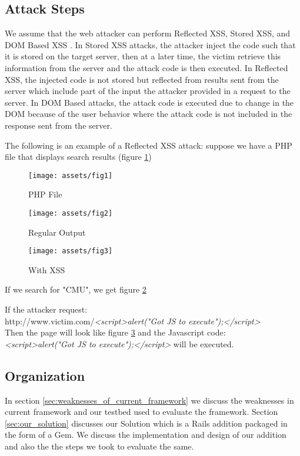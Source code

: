 \documentclass[10pt, conference, compsocconf]{IEEEtran}
\begin{document}
\subsection{Attack Steps}
We assume that the web attacker can perform Reflected XSS, Stored XSS, and DOM Based XSS \cite{IEEEhowto:owasp}. In Stored XSS attacks, the attacker inject the code such that it is stored on the target server, then at a later time, the victim retrieve this information from the server and the attack code is then executed. In Reflected XSS, the injected code is not stored but reflected from results sent from the server which include part of the input the attacker provided in a request to the server. In DOM Based attacks, the attack code is executed due to change in the DOM because of the user behavior where the attack code is not included in the response sent from the server. 

The following is an example of a Reflected XSS attack: suppose we have a PHP file that displays search results (figure \ref{fig:figure1})

\begin{figure}[hb]
 \caption{PHP File}
 \label{fig:figure1}
 \centering
 \texttt{[image: assets/fig1]}
\end{figure}

\begin{figure}[hb]
 \caption{Regular Output}
 \label{fig:figure2}
 \centering
 \texttt{[image: assets/fig2]}
\end{figure}

\begin{figure}[hb]
 \caption{With XSS}
 \label{fig:figure3}
 \centering
 \texttt{[image: assets/fig3]}
\end{figure}

If we search for "CMU", we get figure \ref{fig:figure2}

If the attacker request:\\
http://www.victim.com/\emph{<script>alert("Got JS to execute");</script>}\\
Then the page will look like figure \ref{fig:figure3} and the Javascript code:\\ \emph{<script>alert("Got JS to execute");</script>} will be executed.

\subsection{Organization}
In section \ref{sec:weaknesses_of_current_framework} we discuss the weaknesses in current framework and our testbed used to evaluate the framework. Section \ref{sec:our_solution} discusses our Solution which is a Rails addition packaged in the form of a Gem. We discuss the implementation and design of our addition and also the the steps we took to evaluate the same.
\end{document}
